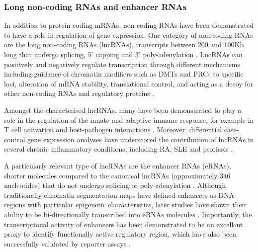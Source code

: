 \subsubsection{Long non-coding RNAs and enhancer RNAs}
In addition to protein coding mRNAs, non-coding RNAs have been demonstrated to have a role in regulation of gene expression. One category of non-coding RNAs are the long non-coding RNAs (lncRNAs), transcripts between 200 and 100Kb long that undergo splicing, 5' capping and 3' poly-adenylation \parencite{Derrien2012}. LncRNAs can positively and negatively regulate transcription through different mechanisms including guidance of chromatin modifiers such as DMTs and PRCs to specific loci, alteration of mRNA stability, translational control, and acting as a decoy for other non-coding RNAs and regulatory proteins \parencite{Pandey2008,Faghihi2008,Gong2011,Carrieri2012, Kino2010}.  %

Amongst the characterised lncRNAs, many have been demonstrated to play a role in the regulation of the innate and adaptive immune response, for example in T cell activation and host-pathogen interactions \parencite{Pang2009, Rossetto2012}. Moreover, differential case-control gene expression analyses have underscored the contribution of lncRNAs in several chronic inflammatory conditions, including RA, SLE and psoriasis \parencite{Mueller2014,Shi2014,Li2014,Ahn2016}.

A particularly relevant type of lncRNAs are the enhancer RNAs (eRNAs), shorter molecules compared to the canonical lncRNAs (approximately 346 nucleotides) that do not undergo splicing or poly-adenylation \parencite{FANTOM2014}. Although traditionally chromatin segmentation maps have defined enhancers as DNA regions with particular epigenetic characteristics, later studies have shown their ability to be bi-directionally transcribed into eRNAs molecules \parencite{De Santa2010, Kim2010}. Importantly, the transcriptional activity of enhancers has been demonstrated to be an excellent proxy to identify functionally active regulatory region, which have also been successfully validated by reporter assays \parencite{FANTOM2014, Anderssen2014}. 

